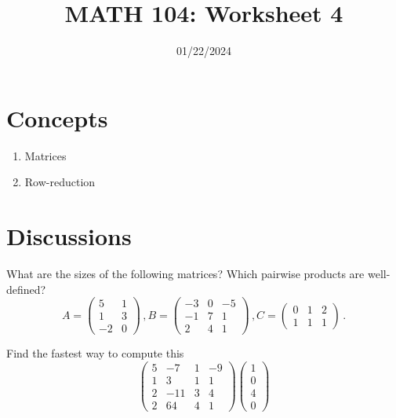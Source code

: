 \documentclass[12pt]{amsart}
\title{ MATH 104: Worksheet 4}
\author{}
\date{01/22/2024}
\begin{document}
\maketitle

\section{Concepts}

\begin{enumerate}
    \item Matrices
    \item Row-reduction 
\end{enumerate}

\section{Discussions}

\begin{question}
    What are the sizes of the following matrices? Which pairwise products are well-defined?
    \begin{equation*}
        A = \begin{pmatrix}
            5 & 1 \\ 1 & 3 \\ -2 & 0
        \end{pmatrix}
        \,,
        B = \begin{pmatrix}
            -3 & 0 &-5 \\ -1 & 7 &1 \\ 2 &4 &1
        \end{pmatrix} \,,
        C = \begin{pmatrix}
            0 & 1 & 2 \\ 1 & 1 &1
        \end{pmatrix}
        \,.
    \end{equation*}
\end{question}

\begin{question}
    Find the fastest way to compute this
    \begin{equation*}
        \begin{pmatrix}
            5 & -7 & 1 & -9 \\
            1 & 3 & 1 & 1 \\
            2 & -11 & 3 & 4 \\
            2 & 64 & 4 & 1 
        \end{pmatrix}
        \begin{pmatrix}
            1 \\ 0  \\ 4 \\ 0
        \end{pmatrix}
    \end{equation*}
\end{question}
\end{document}
